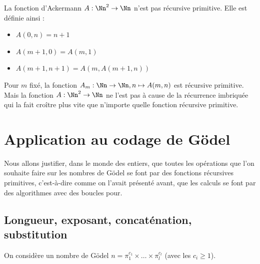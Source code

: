 \documentclass[11pt,class=report,crop=false]{standalone}
\begin{document}
\begin{exemple}
La fonction d'Ackermann $A : \Nn^2 \to \Nn$ n'est pas récursive primitive.
Elle est définie ainsi :
\begin{itemize}
    \item $A(0, n) = n+1$
    \item $A(m+1, 0) = A(m, 1)$
    \item $A(m+1, n+1) = A(m, A(m+1, n))$
\end{itemize}

Pour $m$ fixé, la fonction $A_m : \Nn \to \Nn, n \mapsto A(m,n)$ est récursive primitive. Mais la fonction $A : \Nn^2 \to \Nn$ ne l'est pas à cause de la récurrence imbriquée qui la fait croître plus vite que n'importe quelle fonction récursive primitive.
\end{exemple}



\section{Application au codage de Gödel}


Nous allons justifier, dans le monde des entiers, que toutes les opérations que l'on souhaite faire sur les nombres de Gödel se font par des fonctions récursives primitives, c'est-à-dire comme on l'avait présenté avant, que les calculs se font par des algorithmes avec des boucles \og{}pour\fg{}.

\subsection{Longueur, exposant, concaténation, substitution}

On considère un nombre de Gödel $n = \pi_1^{c_1} \times \dots \times \pi_l^{c_l}$ (avec les $c_i \ge 1$). 
\end{document}
